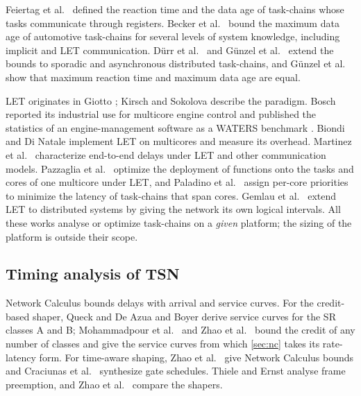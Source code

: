 Feiertag et al.\ \cite{feiertag2008compositional} defined the reaction
time and the data age of task-chains whose tasks communicate through
registers. Becker et al.\ \cite{becker2017end} bound the maximum data age
of automotive task-chains for several levels of system knowledge,
including implicit and LET communication. Dürr et al.\
\cite{durr2019end} and Günzel et al.\ \cite{gunzel2021timing,
gunzel2023compositional} extend the bounds to sporadic and asynchronous
distributed task-chains, and Günzel et al.\ \cite{gunzel2023equivalence}
show that maximum reaction time and maximum data age are equal.

LET originates in Giotto \cite{henzinger2003giotto}; Kirsch and Sokolova
\cite{kirsch2012let} describe the paradigm. Bosch reported its industrial
use for multicore engine control \cite{hamann2017communication} and
published the statistics of an engine-management software as a WATERS
benchmark \cite{kramer2015waters}. Biondi and Di Natale
\cite{biondi2018achieving} implement LET on multicores and measure its
overhead. Martinez et al.\ \cite{martinez2018analytical,martinez2020end}
characterize end-to-end delays under LET and other communication models.
Pazzaglia et al.\ \cite{pazzaglia2019optimizing} optimize the deployment
of functions onto the tasks and cores of one multicore under LET, and
Paladino et al.\ \cite{paladino2024optimizing} assign per-core priorities
to minimize the latency of task-chains that span cores. Gemlau et al.\
\cite{gemlau2021system} extend LET to distributed systems by giving the
network its own logical intervals. All these works analyse or optimize
task-chains on a \emph{given} platform; the sizing of the platform is
outside their scope.

\subsection{Timing analysis of TSN}

Network Calculus \cite{cruz1991calculus,leboudec2001network} bounds delays
with arrival and service curves. For the credit-based shaper, Queck
\cite{queck2012analysis} and De Azua and Boyer \cite{azua2014complete}
derive service curves for the SR classes A and B; Mohammadpour et al.\
\cite{mohammadpour2018latency} and Zhao et al.\ \cite{zhao2021latency}
bound the credit of any number of classes and give the service curves
from which \cref{sec:nc} takes its rate-latency form. For time-aware shaping, Zhao et al.\
\cite{zhao2018worst} give Network Calculus bounds and Craciunas et al.\
\cite{craciunas2016scheduling} synthesize gate schedules. Thiele and Ernst
\cite{thiele2016formal} analyse frame preemption, and Zhao et al.\
\cite{zhao2022quantitative} compare the shapers.

